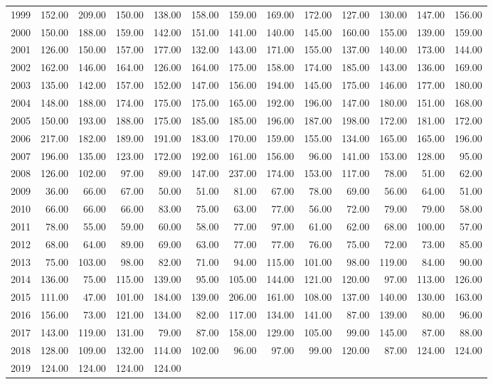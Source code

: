 \begin{longtable}{rrrrrrrrrrrrr}
  1999 & 152.00 & 209.00 & 150.00 & 138.00 & 158.00 & 159.00 & 169.00 & 172.00 & 127.00 & 130.00 & 147.00 & 156.00 \\ 
  2000 & 150.00 & 188.00 & 159.00 & 142.00 & 151.00 & 141.00 & 140.00 & 145.00 & 160.00 & 155.00 & 139.00 & 159.00 \\ 
  2001 & 126.00 & 150.00 & 157.00 & 177.00 & 132.00 & 143.00 & 171.00 & 155.00 & 137.00 & 140.00 & 173.00 & 144.00 \\ 
  2002 & 162.00 & 146.00 & 164.00 & 126.00 & 164.00 & 175.00 & 158.00 & 174.00 & 185.00 & 143.00 & 136.00 & 169.00 \\ 
  2003 & 135.00 & 142.00 & 157.00 & 152.00 & 147.00 & 156.00 & 194.00 & 145.00 & 175.00 & 146.00 & 177.00 & 180.00 \\ 
  2004 & 148.00 & 188.00 & 174.00 & 175.00 & 175.00 & 165.00 & 192.00 & 196.00 & 147.00 & 180.00 & 151.00 & 168.00 \\ 
  2005 & 150.00 & 193.00 & 188.00 & 175.00 & 185.00 & 185.00 & 196.00 & 187.00 & 198.00 & 172.00 & 181.00 & 172.00 \\ 
  2006 & 217.00 & 182.00 & 189.00 & 191.00 & 183.00 & 170.00 & 159.00 & 155.00 & 134.00 & 165.00 & 165.00 & 196.00 \\ 
  2007 & 196.00 & 135.00 & 123.00 & 172.00 & 192.00 & 161.00 & 156.00 & 96.00 & 141.00 & 153.00 & 128.00 & 95.00 \\ 
  2008 & 126.00 & 102.00 & 97.00 & 89.00 & 147.00 & 237.00 & 174.00 & 153.00 & 117.00 & 78.00 & 51.00 & 62.00 \\ 
  2009 & 36.00 & 66.00 & 67.00 & 50.00 & 51.00 & 81.00 & 67.00 & 78.00 & 69.00 & 56.00 & 64.00 & 51.00 \\ 
  2010 & 66.00 & 66.00 & 66.00 & 83.00 & 75.00 & 63.00 & 77.00 & 56.00 & 72.00 & 79.00 & 79.00 & 58.00 \\ 
  2011 & 78.00 & 55.00 & 59.00 & 60.00 & 58.00 & 77.00 & 97.00 & 61.00 & 62.00 & 68.00 & 100.00 & 57.00 \\ 
  2012 & 68.00 & 64.00 & 89.00 & 69.00 & 63.00 & 77.00 & 77.00 & 76.00 & 75.00 & 72.00 & 73.00 & 85.00 \\ 
  2013 & 75.00 & 103.00 & 98.00 & 82.00 & 71.00 & 94.00 & 115.00 & 101.00 & 98.00 & 119.00 & 84.00 & 90.00 \\ 
  2014 & 136.00 & 75.00 & 115.00 & 139.00 & 95.00 & 105.00 & 144.00 & 121.00 & 120.00 & 97.00 & 113.00 & 126.00 \\ 
  2015 & 111.00 & 47.00 & 101.00 & 184.00 & 139.00 & 206.00 & 161.00 & 108.00 & 137.00 & 140.00 & 130.00 & 163.00 \\ 
  2016 & 156.00 & 73.00 & 121.00 & 134.00 & 82.00 & 117.00 & 134.00 & 141.00 & 87.00 & 139.00 & 80.00 & 96.00 \\ 
  2017 & 143.00 & 119.00 & 131.00 & 79.00 & 87.00 & 158.00 & 129.00 & 105.00 & 99.00 & 145.00 & 87.00 & 88.00 \\ 
  2018 & 128.00 & 109.00 & 132.00 & 114.00 & 102.00 & 96.00 & 97.00 & 99.00 & 120.00 & 87.00 & 124.00 & 124.00 \\ 
  2019 & 124.00 & 124.00 & 124.00 & 124.00 &  &  &  &  &  &  &  &  \\ 
   \hline
\hline
\end{longtable}
